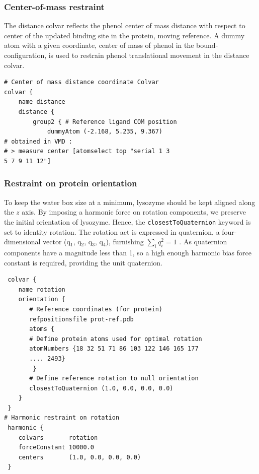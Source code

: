 \documentclass[9pt,tutorial]{livecoms}
\begin{document}
\subsubsection{Center-of-mass restraint}\label{section 6.3.3}

The distance colvar reflects the phenol center of mass distance with respect to center of the updated binding site in the protein, moving reference.  A dummy atom with a given coordinate, center of mass of phenol in the bound-configuration, is used to restrain phenol translational movement in the distance colvar.

\begin{verbatim}
# Center of mass distance coordinate Colvar
colvar {
    name distance
    distance {
        group2 { # Reference ligand COM position
            dummyAtom (-2.168, 5.235, 9.367)
# obtained in VMD :
# > measure center [atomselect top "serial 1 3 
5 7 9 11 12"]
\end{verbatim}

\subsubsection{Restraint on protein orientation}\label{sec:rotational restraint}

To keep the water box size at a minimum, lysozyme should be kept aligned along the $z$ axis. By imposing a harmonic force on rotation components, we preserve the initial orientation of lysozyme. Hence, the \texttt{closestToQuaternion} keyword is set to identity rotation. The rotation act is expressed in quaternion, a four-dimensional vector (q$_1$, q$_2$, q$_3$, q$_4$), furnishing \( \sum_{i}q_i^2=1\) \cite{Bar-Itzhack2000,Eberly2002}. As quaternion components have a magnitude less than 1, so a high enough harmonic bias force constant is required, providing the unit quaternion.
\begin{verbatim}
 colvar {
    name rotation
    orientation {
       # Reference coordinates (for protein)
       refpositionsfile prot-ref.pdb 
       atoms {
       # Define protein atoms used for optimal rotation
       atomNumbers {18 32 51 71 86 103 122 146 165 177 
       .... 2493}
        }
       # Define reference rotation to null orientation
       closestToQuaternion (1.0, 0.0, 0.0, 0.0)
    }
 }
# Harmonic restraint on rotation       
 harmonic {
    colvars       rotation
    forceConstant 10000.0
    centers       (1.0, 0.0, 0.0, 0.0)
 }
\end{verbatim}
\end{document}
